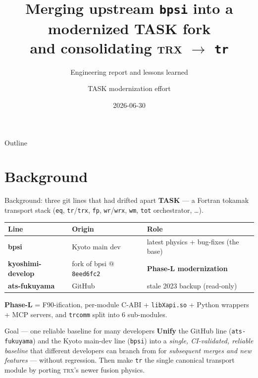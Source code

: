 \documentclass[10pt,aspectratio=169]{beamer}
\title[TASK merge \& TRX port]{Merging upstream \texttt{bpsi} into a modernized TASK fork\\
and consolidating \textsc{trx} $\to$ \texttt{tr}}
\subtitle{Engineering report and lessons learned}
\author{TASK modernization effort}
\institute[]{Plasma simulation stack --- P0 merge (delivered) + P1 fusion port (in progress)}
\date{2026-06-30}
\newcommand{\C}[1]{\texttt{\small #1}}          %
\begin{document}
\begin{frame}[plain]\titlepage\end{frame}

\begin{frame}{Outline}\tableofcontents\end{frame}

\section{Background}
\begin{frame}{Background: three git lines that had drifted apart}
\textbf{TASK} --- a Fortran tokamak transport stack (\C{eq}, \C{tr}/\C{trx},
\C{fp}, \C{wr}/\C{wrx}, \C{wm}, \C{tot} orchestrator, \dots).
\vspace{0.6em}
\begin{table}\footnotesize
\begin{tabular}{@{}lll@{}}
\toprule
Line & Origin & Role \\
\midrule
\textbf{bpsi} & Kyoto main dev & latest physics + bug-fixes (the base) \\
\textbf{kyoshimi-develop} & fork of bpsi @ \C{8eed6fc2} & \textbf{Phase-L modernization} \\
\textbf{ats-fukuyama} & GitHub & stale 2023 backup (read-only) \\
\bottomrule
\end{tabular}
\end{table}
\vspace{0.4em}
\textbf{Phase-L} = F90-ification, per-module C-ABI + \C{libXapi.so} + Python wrappers + MCP
servers, and \C{trcomm} split into 6 sub-modules.
\vspace{0.6em}

\begin{block}{Goal --- one reliable baseline for many developers}
\textbf{Unify} the GitHub line (\C{ats-fukuyama}) and the Kyoto main-dev line (\C{bpsi}) into a
\emph{single, CI-validated, reliable baseline} that different developers can branch from for
\emph{subsequent merges and new features} --- without regression. Then make \C{tr} the single
canonical transport module by porting \textsc{trx}'s newer fusion physics.
\end{block}
\end{frame}

\end{document}
